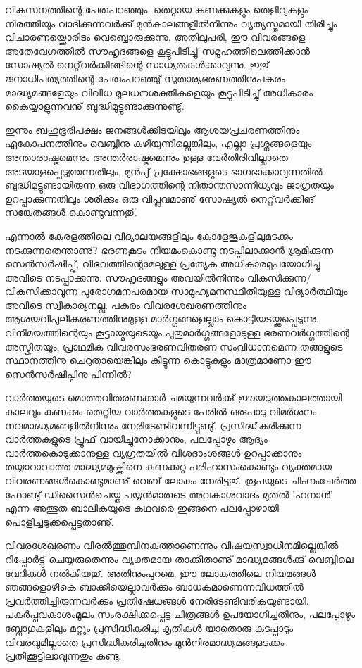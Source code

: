 വികസനത്തിന്റെ പേരുപറഞ്ഞും, തെറ്റായ കണക്കുകളും തെളിവുകളും നിരത്തിയും വാദിക്കുന്നവര്‍ക്കു് മുന്‍കാലങ്ങളില്‍നിന്നും 
വ്യത്യസ്തമായി തിരിച്ചും വിചാരണയ്ക്കൊരിടം വെബ്ബൊരുക്കുന്നു. അതിലുപരി, ഈ വിവരങ്ങളെ അതേവേഗത്തില്‍ സൗഹൃദങ്ങളെ
 കൂട്ടുപിടിച്ചു് സമൂഹത്തിലെത്തിക്കാന്‍ സോഷ്യല്‍ നെറ്റ്‌വര്‍ക്കിങ്ങിന്റെ സാധ്യതകള്‍ക്കാവുന്നു. ഇതു് ജനാധിപത്യത്തിന്റെ 
പേരുംപറഞ്ഞു് സുതാര്യഭരണത്തിനുപകരം മാദ്ധ്യമങ്ങളേയും വിവിധ മൂലധനശക്തികളെയും കൂട്ടുപിടിച്ചു് അധികാരം കൈയ്യാളുന്നവനു് 
ബുദ്ധിമുട്ടുണ്ടാക്കുന്നുണ്ടു്.

ഇന്നും ബഹുഭൂരിപക്ഷം ജനങ്ങള്‍ക്കിടയിലും ആശയപ്രചരണത്തിനും ഏകോപനത്തിനും വെബ്ബിനു കഴിയുന്നില്ലെങ്കിലും, എല്ലാ 
പ്രശ്നങ്ങളെയും അന്താരാഷ്ട്രമെന്നും അന്തര്‍രാഷ്ട്രമെന്നും ഉള്ള വേര്‍തിരിവില്ലാതെ അടയാളപ്പെടുത്തുന്നതിലും, മുന്‍പു് പ്രക്ഷോഭങ്ങളുടെ 
ഭാഗഭാക്കാവുന്നതില്‍ ബുദ്ധിമുട്ടുണ്ടായിരുന്ന ഒരു വിഭാഗത്തിന്റെ നിതാന്തസാന്നിധ്യവും ജാഗ്രതയും ഉറപ്പാക്കുന്നതിലും ശരിക്കും ഒരു 
വിപ്ലവമാണു് സോഷ്യല്‍ നെറ്റ്‌വര്‍ക്കിങ് സങ്കേതങ്ങള്‍ കൊണ്ടുവന്നതു്.

എന്നാല്‍ കേരളത്തിലെ വിദ്യാലയങ്ങളിലും കോളേജുകളിലുമടക്കം നടക്കുന്നതെന്താണു്? ഭരണകൂടം നിയമംകൊണ്ടു 
നടപ്പിലാക്കാന്‍ ശ്രമിക്കുന്ന സെന്‍സര്‍ഷിപ്പു്, വിഭവത്തിന്റെമേലുള്ള പ്രത്യേക അധികാരമുപയോഗിച്ചു അവിടെ നടപ്പാക്കുന്നു. 
സൗഹൃദങ്ങളും അവയില്‍നിന്നും വികസിക്കുന്ന/വികസിക്കാവുന്ന പുരോഗമനപരമായ സാമൂഹ്യമനസ്ഥിതിയുള്ള വിദ്യാര്‍ത്ഥിയും 
അവിടെ സ്വീകാര്യനല്ല. പകരം വിവരശേഖരണത്തിനും ആശയവിപുലീകരണത്തിനുമുള്ള മാര്‍ഗ്ഗങ്ങളെല്ലാം 
കൊട്ടിയടയ്ക്കപ്പെടുന്നു. വിനിമയത്തിന്റെയും കൂട്ടായ്മയുടെയും പുതുമാര്‍ഗ്ഗങ്ങളോടുള്ള ഭരണവര്‍ഗ്ഗത്തിന്റെ അസ്കിതയും, 
പ്രാഥമിക വിവരസംഭരണവിതരണ സംവിധാനമെന്ന തങ്ങളുടെ സ്ഥാനത്തിനു ചെറുതായെങ്കിലും കിട്ടുന്ന കൊട്ടുകളും 
മാത്രമാണോ ഈ സെന്‍സര്‍ഷിപ്പിനു പിന്നില്‍?

വാര്‍ത്തയുടെ മൊത്തവിതരണക്കാര്‍ ചമയുന്നവര്‍ക്കു് ഈയടുത്തകാലത്തായി കാലവും കണക്കും തെറ്റിയ വാര്‍ത്തകളുടെ പേരില്‍ 
ഒരുപാടു വിമര്‍ശനം നവമാദ്ധ്യമങ്ങളില്‍നിന്നും നേരിടേണ്ടിവന്നിട്ടുണ്ടു്. പ്രസിദ്ധീകരിക്കുന്ന വാര്‍ത്തകളുടെ പ്രൂഫ് വായിച്ചുനോക്കാനും, 
പലപ്പോഴും ആദ്യം വാര്‍ത്തകൊടുക്കാനുള്ള വ്യഗ്രതയില്‍ വിശദാംശങ്ങള്‍ ഉറപ്പാക്കാനും തയ്യാറാവാത്ത മാദ്ധ്യമമുഷ്ക്കിനെ 
കണക്കറ്റ പരിഹാസംകൊണ്ടും വ്യക്തമായ വിവരണങ്ങള്‍കൊണ്ടുമാണു് വെബ് ലോകം നേരിട്ടതു്. രൂപയുടെ ചിഹ്നംചേര്‍ത്ത ഫോണ്ടു് 
ഡിസൈന്‍ചെയ്ത പയ്യന്‍മാരുടെ അവകാശവാദം മുതല്‍ 'ഹനാന്‍' എന്ന അത്ഭുത ബാലികയുടെ കഥവരെ ഇങ്ങനെ പലപ്പോഴായി 
പൊളിച്ചടുക്കപ്പെട്ടതാണു്.

വിവരശേഖരണം വിരല്‍ത്തുമ്പിനകത്താണെന്നും വിഷയസ്വാധീനമില്ലെങ്കില്‍ റിപ്പോര്‍ട്ടു് ചെയ്യരുതെന്നും വ്യക്തമായ താക്കീതാണു് 
മാദ്ധ്യമങ്ങള്‍ക്കു് വെബ്ബിലെ വേദികള്‍ നല്‍കിയതു്. അതിനുംപുറമെ, ഈ ലോകത്തിലെ നിയമങ്ങള്‍ ഞങ്ങളൊഴികെ 
ബാക്കിയെല്ലാവര്‍ക്കും ബാധകമാണെന്നവിധത്തില്‍ പ്രവര്‍ത്തിച്ചിരുന്നവര്‍ക്കും പ്രതിഷേധങ്ങള്‍ നേരിടേണ്ടിവരികയുണ്ടായി.
 പകര്‍പ്പവകാശംമൂലം സംരക്ഷിക്കപ്പെട്ട ചിത്രങ്ങള്‍ ഉപയോഗിച്ചതിനും, പലപ്പോഴും ബ്ലോഗുകളിലും മറ്റും പ്രസിദ്ധീകരിച്ച കൃതികള്‍ 
യാതൊരു കടപ്പാടും വിവരവുമില്ലാതെ പ്രസിദ്ധീകരിച്ചതിനും മുന്‍നിരമാദ്ധ്യമങ്ങളടക്കം പ്രതിക്കൂട്ടിലാവുന്നതും കണ്ടു.

